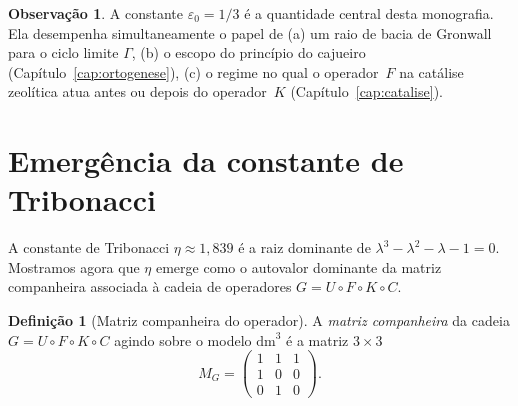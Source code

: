 \documentclass[12pt,a4paper,twoside]{book}
\theoremstyle{plain}
\theoremstyle{definition}
\theoremstyle{definition}
\newtheorem{definicao}[teorema]{Definição}
\newtheorem{observacao}[teorema]{Observação}
\newcommand{\epsz}{\varepsilon_{0}}
\newcommand{\tribo}{\eta}
\newcommand{\dm}{\mathrm{dm}^{3}}
\begin{document}
\begin{observacao}
A constante $\epsz = 1/3$ é a quantidade central desta monografia.
Ela desempenha simultaneamente o papel de (a) um raio de bacia de
Gronwall para o ciclo limite $\Gamma$, (b) o escopo do princípio do
cajueiro (Capítulo~\ref{cap:ortogenese}), (c) o regime no qual o
operador~$F$ na catálise zeolítica atua antes ou depois do operador~$K$
(Capítulo~\ref{cap:catalise}).
\end{observacao}

\section{Emergência da constante de Tribonacci}
\label{sec:dm3-tribo}

A constante de Tribonacci $\tribo \approx 1{,}839$ é a raiz dominante de
$\lambda^{3} - \lambda^{2} - \lambda - 1 = 0$. Mostramos agora que
$\tribo$ emerge como o autovalor dominante da matriz companheira
associada à cadeia de operadores $G = U \circ F \circ K \circ C$.

\begin{definicao}[Matriz companheira do operador]\label{def:companheira}
A \emph{matriz companheira} da cadeia $G = U \circ F \circ K \circ C$ agindo
sobre o modelo $\dm$ é a matriz $3\times 3$
\begin{equation}\label{eq:companheira}
  M_{G} = \begin{pmatrix} 1 & 1 & 1 \\ 1 & 0 & 0 \\ 0 & 1 & 0 \end{pmatrix}.
\end{equation}
\end{definicao}
\end{document}
